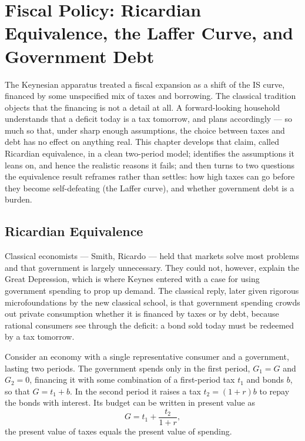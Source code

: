 \chapter{Fiscal Policy: Ricardian Equivalence, the Laffer Curve, and Government Debt}
\label{ch:fiscal}

The Keynesian apparatus treated a fiscal expansion as a shift of the IS curve, financed by some unspecified mix of taxes and borrowing. The classical tradition objects that the financing is not a detail at all. A forward-looking household understands that a deficit today is a tax tomorrow, and plans accordingly --- so much so that, under sharp enough assumptions, the choice between taxes and debt has no effect on anything real. This chapter develops that claim, called Ricardian equivalence, in a clean two-period model; identifies the assumptions it leans on, and hence the realistic reasons it fails; and then turns to two questions the equivalence result reframes rather than settles: how high taxes can go before they become self-defeating (the Laffer curve), and whether government debt is a burden.

\section{Ricardian Equivalence}

Classical economists --- Smith, Ricardo --- held that markets solve most problems and that government is largely unnecessary. They could not, however, explain the Great Depression, which is where Keynes entered with a case for using government spending to prop up demand. The classical reply, later given rigorous microfoundations by the new classical school, is that government spending crowds out private consumption whether it is financed by taxes or by debt, because rational consumers see through the deficit: a bond sold today must be redeemed by a tax tomorrow.

Consider an economy with a single representative consumer and a government, lasting two periods. The government spends only in the first period, $G_1=G$ and $G_2=0$, financing it with some combination of a first-period tax $t_1$ and bonds $b$, so that $G=t_1+b$. In the second period it raises a tax $t_2=(1+r)b$ to repay the bonds with interest. Its budget can be written in present value as
\[
G = t_1 + \frac{t_2}{1+r},
\]
the present value of taxes equals the present value of spending.


